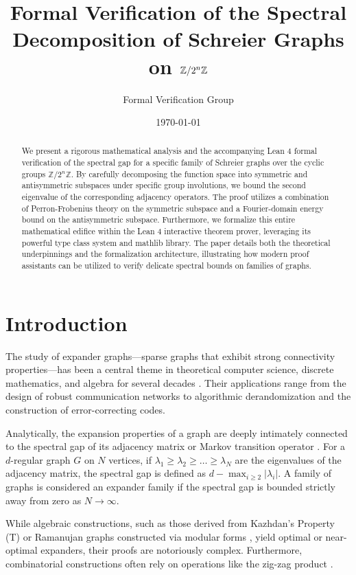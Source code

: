 \documentclass[11pt, a4paper]{article}
\title{Formal Verification of the Spectral Decomposition of Schreier Graphs on $\Z/2^n\Z$}
\author{Formal Verification Group}
\date{\today}
\theoremstyle{definition}
\newcommand{\Z}{\mathbb{Z}}
\begin{document}
\maketitle

\begin{abstract}
We present a rigorous mathematical analysis and the accompanying Lean 4 formal verification of the spectral gap for a specific family of Schreier graphs over the cyclic groups $\Z/2^n\Z$. By carefully decomposing the function space into symmetric and antisymmetric subspaces under specific group involutions, we bound the second eigenvalue of the corresponding adjacency operators. The proof utilizes a combination of Perron-Frobenius theory on the symmetric subspace and a Fourier-domain energy bound on the antisymmetric subspace. Furthermore, we formalize this entire mathematical edifice within the Lean 4 interactive theorem prover, leveraging its powerful type class system and mathlib library. The paper details both the theoretical underpinnings and the formalization architecture, illustrating how modern proof assistants can be utilized to verify delicate spectral bounds on families of graphs.
\end{abstract}

\tableofcontents

\newpage

\section{Introduction}

The study of expander graphs---sparse graphs that exhibit strong connectivity properties---has been a central theme in theoretical computer science, discrete mathematics, and algebra for several decades \cite{hoory2006expander}. Their applications range from the design of robust communication networks to algorithmic derandomization and the construction of error-correcting codes. 

Analytically, the expansion properties of a graph are deeply intimately connected to the spectral gap of its adjacency matrix or Markov transition operator \cite{alon1986eigenvalues}. For a $d$-regular graph $G$ on $N$ vertices, if $\lambda_1 \ge \lambda_2 \ge \dots \ge \lambda_N$ are the eigenvalues of the adjacency matrix, the spectral gap is defined as $d - \max_{i \ge 2} |\lambda_i|$. A family of graphs is considered an expander family if the spectral gap is bounded strictly away from zero as $N \to \infty$.

While algebraic constructions, such as those derived from Kazhdan's Property (T) or Ramanujan graphs constructed via modular forms \cite{lubotzky1994discrete}, yield optimal or near-optimal expanders, their proofs are notoriously complex. Furthermore, combinatorial constructions often rely on operations like the zig-zag product \cite{reingold2005undirected, rozenman2006iterative}.
\end{document}
